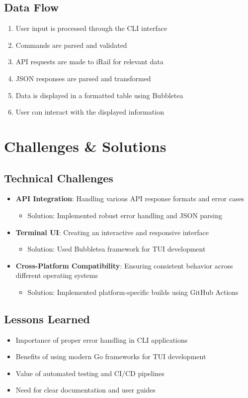 \documentclass[10pt,a4paper]{article}
\begin{document}
\subsection{Data Flow}
\begin{enumerate}
	\item User input is processed through the CLI interface
	\item Commands are parsed and validated
	\item API requests are made to iRail for relevant data
	\item JSON responses are parsed and transformed
	\item Data is displayed in a formatted table using Bubbletea
	\item User can interact with the displayed information
\end{enumerate}

\section{Challenges \& Solutions}
\subsection{Technical Challenges}
\begin{itemize}
	\item \textbf{API Integration}: Handling various API response formats and error cases
	      \begin{itemize}
		      \item Solution: Implemented robust error handling and JSON parsing
	      \end{itemize}
	\item \textbf{Terminal UI}: Creating an interactive and responsive interface
	      \begin{itemize}
		      \item Solution: Used Bubbletea framework for TUI development
	      \end{itemize}
	\item \textbf{Cross-Platform Compatibility}: Ensuring consistent behavior across different operating systems
	      \begin{itemize}
		      \item Solution: Implemented platform-specific builds using GitHub Actions
	      \end{itemize}
\end{itemize}

\subsection{Lessons Learned}
\begin{itemize}
	\item Importance of proper error handling in CLI applications
	\item Benefits of using modern Go frameworks for TUI development
	\item Value of automated testing and CI/CD pipelines
	\item Need for clear documentation and user guides
\end{itemize}
\end{document}
